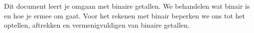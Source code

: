 Dit document leert je omgaan met binaire getallen. We behandelen wat binair is en hoe je ermee om gaat. Voor het rekenen met binair beperken we ons tot het optellen, aftrekken en vermenigvuldigen van binaire getallen.

